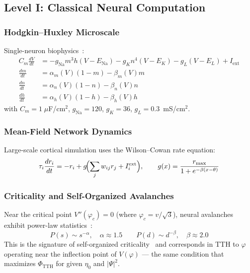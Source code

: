 \documentclass[12pt,a4paper]{article}
\newcommand{\phiTTH}{\Phi_{\mathrm{TTH}}}
\numberwithin{equation}{section}
\begin{document}
\subsection{Level I: Classical Neural Computation}

\subsubsection{Hodgkin--Huxley Microscale}

Single-neuron biophysics~\citep{Hodgkin1952}:
\begin{align}
  C_m\frac{dV}{dt} &= -g_{\mathrm{Na}}m^3h(V-E_{\mathrm{Na}})
  - g_K n^4(V-E_K) - g_L(V-E_L) + I_{\mathrm{ext}} \label{eq:HH}\\
  \frac{dm}{dt} &= \alpha_m(V)(1-m) - \beta_m(V)m \label{eq:HH_m}\\
  \frac{dn}{dt} &= \alpha_n(V)(1-n) - \beta_n(V)n \label{eq:HH_n}\\
  \frac{dh}{dt} &= \alpha_h(V)(1-h) - \beta_h(V)h \label{eq:HH_h}
\end{align}
with $C_m = 1\;\mu$F/cm$^2$, $g_{\mathrm{Na}} = 120$, $g_K = 36$,
$g_L = 0.3$~mS/cm$^2$.

\subsubsection{Mean-Field Network Dynamics}

Large-scale cortical simulation uses the Wilson--Cowan rate equation:
\begin{equation}
  \tau_i\frac{dr_i}{dt} = -r_i + g\!\Bigl(\sum_j w_{ij}r_j + I_i^{\mathrm{ext}}\Bigr),
  \qquad
  g(x) = \frac{r_{\max}}{1+e^{-\beta(x-\theta)}}
  \label{eq:rate_eq}
\end{equation}

\subsubsection{Criticality and Self-Organized Avalanches}

Near the critical point $V''(\varphi_c) = 0$ (where $\varphi_c = v/\sqrt3$),
neural avalanches exhibit power-law statistics~\citep{Beggs2003}:
\begin{equation}
  P(s) \sim s^{-\alpha},\quad \alpha \approx 1.5 \qquad
  P(d) \sim d^{-\beta},\quad \beta \approx 2.0
  \label{eq:avalanches}
\end{equation}
This is the signature of self-organized criticality~\citep{Bak1987} and
corresponds in TTH to $\varphi$ operating near the inflection point of
$V(\varphi)$ --- the same condition that maximizes $\phiTTH$ for given
$\eta_0$ and $|\Psi|^2$.
\end{document}
